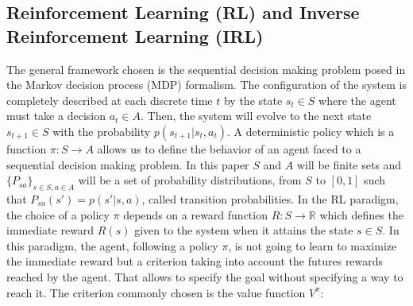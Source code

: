 \documentclass{article}
\begin{document}
\subsection{Reinforcement Learning (RL) and Inverse Reinforcement Learning (IRL)}
The general framework chosen is the sequential decision making problem posed in the Markov decision process (MDP) formalism. The configuration of the system is completely described at each discrete time $t$ by the state $s_t \in S$ where the agent must take a decision $a_t\in A$. Then, the system will evolve to the next state $s_{t+1} \in S$ with the probability $p(s_{t+1}|s_t, a_t)$. A deterministic policy which is a function $\pi: S\rightarrow A$ allows us to define the behavior of an agent faced to a sequential decision making problem. In this paper $S$ and $A$ will be finite sets and $\{P_{sa}\}_{s\in S,a\in A}$ will be a set of probability distributions, from $S$ to $[0,1]$ such that $P_{sa}(s')=p(s'|s, a)$, called transition probabilities.
In the RL paradigm, the choice of a policy $\pi$ depends on a reward function $R: S \rightarrow \mathbb{R}$ which defines the immediate reward $R(s)$ given to the system when it attains the state $s \in S$. In this paradigm, the agent, following a policy $\pi$, is not going to learn to maximize the immediate reward but a criterion taking into account the futures rewards reached by the agent. That allows to specify the goal without specifying a way to reach it. The criterion commonly chosen is the value function $V^\pi$:
\end{document}
